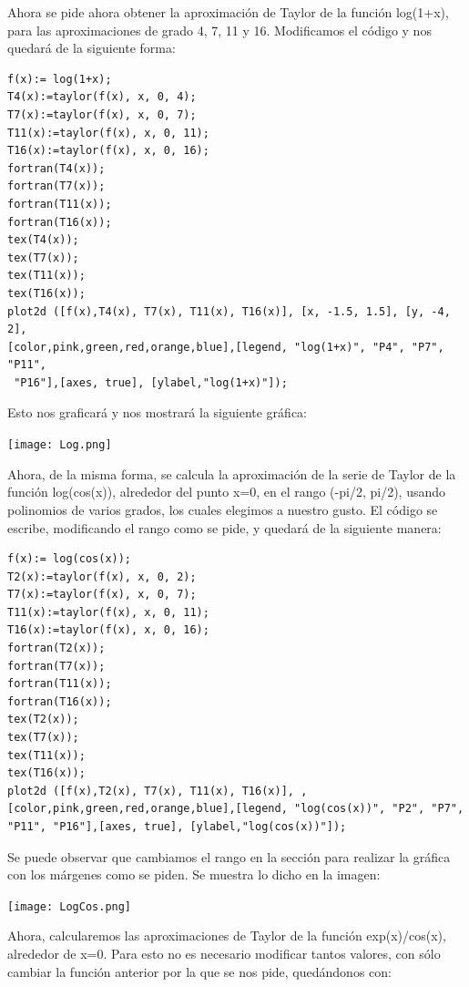 \documentclass[12pt]{article}
\begin{document}
Ahora se pide ahora obtener la aproximación de Taylor de la función log(1+x), para las aproximaciones de grado 4, 7, 11 y 16. Modificamos el código y nos quedará de la siguiente forma:

\begin{verbatim}
f(x):= log(1+x);
T4(x):=taylor(f(x), x, 0, 4);
T7(x):=taylor(f(x), x, 0, 7);
T11(x):=taylor(f(x), x, 0, 11);
T16(x):=taylor(f(x), x, 0, 16);
fortran(T4(x));
fortran(T7(x));
fortran(T11(x));
fortran(T16(x));
tex(T4(x));
tex(T7(x));
tex(T11(x));
tex(T16(x));
plot2d ([f(x),T4(x), T7(x), T11(x), T16(x)], [x, -1.5, 1.5], [y, -4, 2], 
[color,pink,green,red,orange,blue],[legend, "log(1+x)", "P4", "P7", "P11",
 "P16"],[axes, true], [ylabel,"log(1+x)"]);
\end{verbatim}

Esto nos graficará y nos mostrará la siguiente gráfica:

\begin{center}
	\texttt{[image: Log.png]}\\
\end{center}

Ahora, de la misma forma, se calcula la aproximación de la serie de Taylor de la función log(cos(x)), alrededor del punto  x=0, en el rango (-pi/2, pi/2), usando polinomios de varios grados, los cuales elegimos a nuestro gusto. El código se escribe, modificando el rango como se pide, y quedará de la siguiente manera:

\begin{verbatim}
f(x):= log(cos(x));
T2(x):=taylor(f(x), x, 0, 2);
T7(x):=taylor(f(x), x, 0, 7);
T11(x):=taylor(f(x), x, 0, 11);
T16(x):=taylor(f(x), x, 0, 16);
fortran(T2(x));
fortran(T7(x));
fortran(T11(x));
fortran(T16(x));
tex(T2(x));
tex(T7(x));
tex(T11(x));
tex(T16(x));
plot2d ([f(x),T2(x), T7(x), T11(x), T16(x)], , [color,pink,green,red,orange,blue],[legend, "log(cos(x))", "P2", "P7", "P11", "P16"],[axes, true], [ylabel,"log(cos(x))"]);
\end{verbatim}

Se puede observar que cambiamos el rango en la sección para realizar la gráfica con los márgenes como se piden. Se muestra lo dicho en la imagen:

\begin{center}
	\texttt{[image: LogCos.png]}\\
\end{center}

Ahora, calcularemos las aproximaciones de Taylor de la función exp(x)/cos(x), alrededor de x=0. Para esto no es necesario modificar tantos valores, con sólo cambiar la función anterior por la que se nos pide, quedándonos con:
\end{document}
